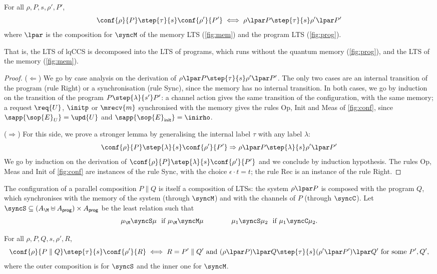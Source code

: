 \begin{lemma}\label{lem:pre-harmony}
For all $\rho, P, s, \rho', P'$,
\[
\conf{\rho}{P} \step{\tau}{s} \conf{\rho'}{P'}
\iff
\rho \lpar P \step{\tau}{s} \rho' \lpar P'
\]
where $\lpar$ is the composition for $\syncM$ of the memory LTS
(\cref{fig:mem}) and the program LTS (\cref{fig:prog}).
\end{lemma}

That is, the LTS of lqCCS is decomposed into the LTS of programs, which runs
without the quantum memory (\cref{fig:prog}), and the LTS of the memory
(\cref{fig:mem}).

\begin{proof}
($\Leftarrow$) We go by case analysis on the derivation of
$\rho \lpar P \step{\tau}{s} \rho' \lpar P'$.
The only two cases are an internal transition of the program (rule Right) or
a synchronisation (rule Sync), since the memory has no internal transition.
In both cases, we go by induction on the transition of the program
$P \step{\lambda}{s'} P'$: a channel action gives the same transition of the
configuration, with the same memory; a request $\req{U}$, $\initp$ or $\mrecv{m}$
synchronised with the memory gives the rules Op, Init and Meas of
\cref{fig:conf}, since $\sapp{\sop{E}_U} = \upd{U}$ and
$\sapp{\sop{E}_{\mathsf{init}}} = \inirho$.

($\Rightarrow$) For this side, we prove a stronger lemma by generalising the
internal label $\tau$ with any label $\lambda$:
$$
  \conf{\rho}{P} \step{\lambda}{s} \conf{\rho'}{P'}
\Rightarrow
\rho \lpar P \step{\lambda}{s} \rho' \lpar P'
$$
We go by induction on the derivation of
$\conf{\rho}{P} \step{\lambda}{s} \conf{\rho'}{P'}$ and we conclude by induction
hypothesis. The rules Op, Meas and Init of \cref{fig:conf} are instances of the rule
Sync, with the choice $\epsilon \cdot t = t$; the rule Rec is an instance of
the rule Right.
\end{proof}

The configuration of a parallel composition $P \parallel Q$ is itself a
composition of LTSs: the system $\rho \lpar P$ is composed with the program
$Q$, which synchronises with the memory of the system (through $\syncM$) and
with the channels of $P$ (through $\syncC$). Let
${\syncS} \subseteq (A_{\M} \uplus A_{\mathsf{prog}}) \times A_{\mathsf{prog}}$
be the least relation such that
\[
\mu_{\M} \syncS \mu \ \text{ if } \mu_{\M} \syncM \mu
\qquad\qquad
\mu_1 \syncS \mu_2 \ \text{ if } \mu_1 \syncC \mu_2 .
\]

\begin{lemma}\label{lem:par-harmony}
For all $\rho, P, Q, s, \rho', R$,
\[
\conf{\rho}{P \parallel Q} \step{\tau}{s} \conf{\rho'}{R}
\iff
R = P' \parallel Q' \text{ and }
(\rho \lpar P) \lpar Q \step{\tau}{s} (\rho' \lpar P') \lpar Q'
\text{ for some } P', Q',
\]
where the outer composition is for $\syncS$ and the inner one for $\syncM$.
\end{lemma}

